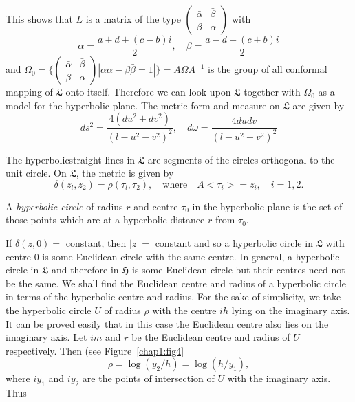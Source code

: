 This shows that $L$ is a matrix of the type $\left(\begin{smallmatrix}
  \bar{\alpha}  & \bar{\beta}\\
\beta & \alpha
\end{smallmatrix}\right)$ with
$$
\alpha = \frac{a+d+(c-b)i}{2}, \quad \beta = \frac{a-d+(c+b)i}{2}
$$
and $\Omega_0 = \{\left(\begin{smallmatrix} \bar{\alpha} &
  \bar{\beta}\\ \beta & \alpha
\end{smallmatrix}\right)|\alpha \bar{\alpha} - \beta \bar{\beta} =1|
\} = A \Omega A^{-1}$ is the group of all conformal mapping of
$\mathfrak{L}$ onto itself. Therefore we can look upon $\mathfrak{L}$
together with $\Omega_0$ as a model for the hyperbolic plane. The
metric form and measure on $\mathfrak{L}$ are given by 
\begin{equation*}
ds^2 = \frac{4(du^2 + dv^2)}{(l-u^2-v^2)^2}, \quad d\omega = \frac{4
  du dv }{(l-u^2 - v^2)^2} \tag{8}\label{eq1:8}
\end{equation*}

The hyperbolic\pageoriginale straight lines in $\mathfrak{L}$ are
segments of the circles orthogonal to the unit circle. On
$\mathfrak{L}$, the metric is given by 
\begin{equation*}
\delta(z_l,z_2) = \rho(\tau_l, \tau_2), \quad \text{where} \quad A
<\tau_i> = z_i, \quad i = 1,2. \tag{9}\label{eq1:9}
\end{equation*}

\begin{defi*}
A \textit{hyperbolic circle} of radius $r$ and centre $\tau_0$ in the
hyperbolic plane is the set of those points which are at a hyperbolic
distance $r$ from $\tau_0$.
\end{defi*}

If $\delta(z,0)=$ constant, then $|z|=$ constant and so a hyperbolic
circle in $\mathfrak{L}$ with centre 0 is some Euclidean circle with
the same centre. In general, a hyperbolic circle in $\mathfrak{L}$ and
therefore in $\mathfrak{H}$ is some Euclidean circle but their centres
need not be the same. We shall find the Euclidean centre and radius of
a hyperbolic circle in terms of the hyperbolic centre and radius. For
the sake of simplicity, we take the hyperbolic circle $U$ of radius
$\rho$ with the centre $ih$ lying on the imaginary axis. It can be
proved easily that in this case the Euclidean centre also lies on the
imaginary axis. Let $im$ and $r$ be the Euclidean centre and radius of
$U$ respectively. Then (see Figure~\ref{chap1:fig4}
$$
\rho = \log (y_2 /h) = \log (h/y_1),
$$
where $iy_1$ and $iy_2$ are the points of intersection of $U$ with the
imaginary axis. Thus 


